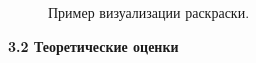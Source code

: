 \FloatBarrier
\begin{figure}[!h]
\centering
\captionsetup{justification=centering}


\caption{Пример визуализации раскраски.}
\label{chapter3:fig:viz}
\end{figure}


\vspace{5pt}
\textbf{3.2 Теоретические оценки}\label{chapters:3.2}
\vspace{5pt}

